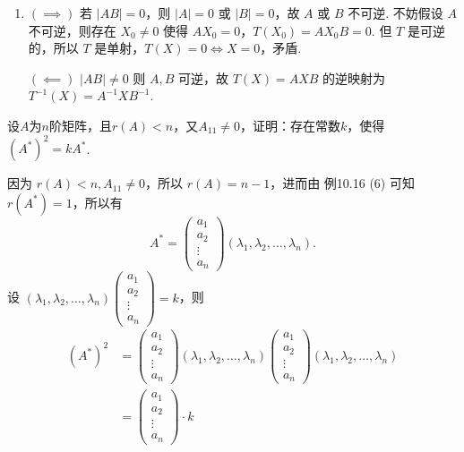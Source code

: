 \begin{exercise}
\begin{exgroup}
\begin{answer}
\begin{enumerate}
                \item $(\implies)$ 若 $\lvert AB \rvert = 0$，则 $\lvert A \rvert = 0$ 或 $\lvert B \rvert = 0$，故 $A$ 或 $B$ 不可逆. 不妨假设 $A$ 不可逆，则存在 $X_0 \neq 0$ 使得 $AX_0 = 0$，$T(X_0) = AX_0B = 0$. 但 $T$ 是可逆的，所以 $T$ 是单射，$T(X) = 0 \Leftrightarrow X = 0$，矛盾.

                      $(\impliedby)$ $\lvert AB \rvert \neq 0$ 则 $A, B$ 可逆，故 $T(X) = AXB$ 的逆映射为 $T^{-1}(X) = A^{-1}XB^{-1}$.
            \end{enumerate}
        \end{answer}

        \item 设$A$为$n$阶矩阵，且$r(A) < n$，又$A_{11} \neq 0$，证明：存在常数$k$，使得$(A^*)^2=kA^*$.
        \begin{answer}
            因为 $r(A) < n, A_{11} \neq 0$，所以 $r(A) = n-1$，进而由 {例10.16 (6)} 可知 $r(A^*) = 1$，所以有 %
            \[A^* = \begin{pmatrix} a_1 \\ a_2 \\ \vdots \\ a_n \end{pmatrix} (\lambda_1, \lambda_2, \ldots, \lambda_n).\]
            设 $(\lambda_1, \lambda_2, \ldots, \lambda_n) \begin{pmatrix} a_1 \\ a_2 \\ \vdots \\ a_n \end{pmatrix} = k$，则
            \begin{align*}
                (A^*)^2 & = \begin{pmatrix}a_1 \\ a_2 \\ \vdots \\ a_n \end{pmatrix}
                (\lambda_1, \lambda_2, \ldots, \lambda_n)
                \begin{pmatrix} a_1 \\ a_2 \\ \vdots \\ a_n \end{pmatrix}
                (\lambda_1, \lambda_2, \ldots, \lambda_n)                                     \\
                        & = \begin{pmatrix} a_1 \\ a_2 \\ \vdots \\ a_n \end{pmatrix} \cdot k

\end{align*}
\end{answer}
\end{exgroup}
\end{exercise}
